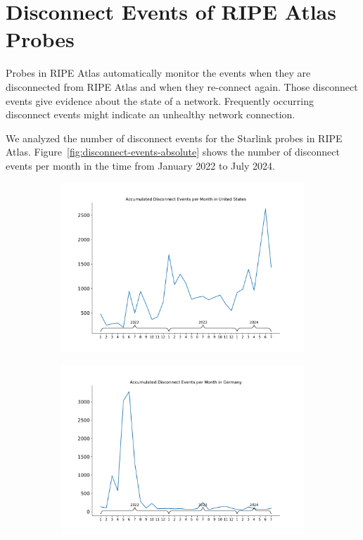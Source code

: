 \section{Disconnect Events of RIPE Atlas Probes} \label{sec:disconnect-events}

Probes in RIPE Atlas automatically monitor the events when they are
disconnected from RIPE Atlas and when they re-connect again. Those disconnect
events give evidence about the state of a network. Frequently occurring
disconnect events might indicate an unhealthy network connection.

We analyzed the number of disconnect events for the Starlink probes in RIPE
Atlas. Figure~\ref{fig:disconnect-events-absolute} shows the number of
disconnect events per month in the time from January 2022 to July 2024.

\begin{figure}
	\centering
	\begin{subfigure}[b]{0.48\linewidth}
		\includegraphics[width=\linewidth]{./chapters/4-results/disconnect_events/US.pdf}
	\end{subfigure}
	\begin{subfigure}[b]{0.48\linewidth}
		\includegraphics[width=\linewidth]{./chapters/4-results/disconnect_events/DE.pdf}

\end{subfigure}
\end{figure}
